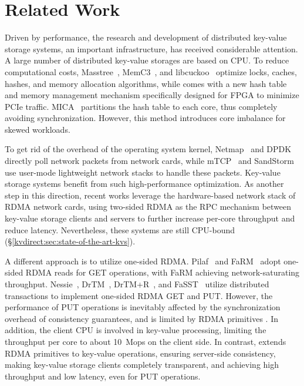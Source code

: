 \section{Related Work}
\label{kvdirect:sec:related}

Driven by performance, the research and development of distributed key-value storage systems, an important infrastructure, has received considerable attention. A large number of distributed key-value storages are based on CPU. To reduce computational costs, Masstree~\cite{mao2012cache}, MemC3~\cite{fan2013memc3}, and libcuckoo~\cite{li2014algorithmic} optimize locks, caches, hashes, and memory allocation algorithms, while \oursys{} comes with a new hash table and memory management mechanism specifically designed for FPGA to minimize PCIe traffic. MICA~\cite{lim2014mica} partitions the hash table to each core, thus completely avoiding synchronization. However, this method introduces core imbalance for skewed workloads.

To get rid of the overhead of the operating system kernel, Netmap~\cite{rizzo2012netmap} and DPDK~\cite{intel2014data} directly poll network packets from network cards, while mTCP~\cite{jeong2014mtcp} and SandStorm~\cite{marinos2014network} use user-mode lightweight network stacks to handle these packets. Key-value storage systems \cite{kapoor2012chronos,ousterhout2010case,ousterhout2015ramcloud,lim2014mica,li2016full} benefit from such high-performance optimization. As another step in this direction, recent works \cite{infiniband2000infiniband,kalia2014using,kalia2016design,kalia2014using,kalia2016design} leverage the hardware-based network stack of RDMA network cards, using two-sided RDMA as the RPC mechanism between key-value storage clients and servers to further increase per-core throughput and reduce latency. Nevertheless, these systems are still CPU-bound (\S \ref{kvdirect:sec:state-of-the-art-kvs}).

A different approach is to utilize one-sided RDMA. Pilaf~\cite{mitchell2013using} and FaRM~\cite{dragojevic2014farm} adopt one-sided RDMA reads for GET operations, with FaRM achieving network-saturating throughput. Nessie~\cite{szepesi2014designing}, DrTM~\cite{wei2015fast}, DrTM+R~\cite{chen2016fast}, and FaSST~\cite{kalia2016fasst} utilize distributed transactions to implement one-sided RDMA GET and PUT. However, the performance of PUT operations is inevitably affected by the synchronization overhead of consistency guarantees, and is limited by RDMA primitives \cite{kalia2016design}. In addition, the client CPU is involved in key-value processing, limiting the throughput per core to about 10~Mops on the client side. In contrast, \oursys{} extends RDMA primitives to key-value operations, ensuring server-side consistency, making key-value storage clients completely transparent, and achieving high throughput and low latency, even for PUT operations.


